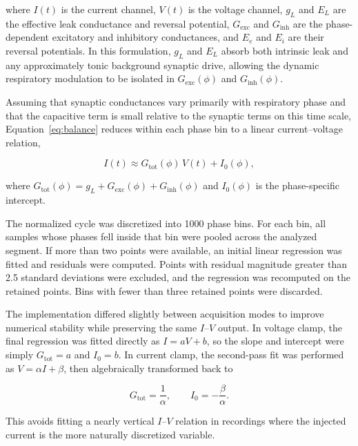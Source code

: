 \documentclass[
]{article}
\begin{document}
where \(I(t)\) is the current channel, \(V(t)\) is the voltage channel, \(g_L\) and \(E_L\) are the effective leak conductance and reversal potential, \(G_{\mathrm{exc}}\) and \(G_{\mathrm{inh}}\) are the phase-dependent excitatory and inhibitory conductances, and \(E_e\) and \(E_i\) are their reversal potentials. In this formulation, \(g_L\) and \(E_L\) absorb both intrinsic leak and any approximately tonic background synaptic drive, allowing the dynamic respiratory modulation to be isolated in \(G_{\mathrm{exc}}(\phi)\) and \(G_{\mathrm{inh}}(\phi)\).

Assuming that synaptic conductances vary primarily with respiratory phase and that the capacitive term is small relative to the synaptic terms on this time scale, Equation~\ref{eq:balance} reduces within each phase bin to a linear current--voltage relation,

\begin{equation}
I(t) \approx G_{\mathrm{tot}}(\phi)\,V(t) + I_0(\phi),
\end{equation}

where \(G_{\mathrm{tot}}(\phi)=g_L+G_{\mathrm{exc}}(\phi)+G_{\mathrm{inh}}(\phi)\) and \(I_0(\phi)\) is the phase-specific intercept.

The normalized cycle was discretized into 1000 phase bins. For each bin, all samples whose phases fell inside that bin were pooled across the analyzed segment. If more than two points were available, an initial linear regression was fitted and residuals were computed. Points with residual magnitude greater than 2.5 standard deviations were excluded, and the regression was recomputed on the retained points. Bins with fewer than three retained points were discarded.

The implementation differed slightly between acquisition modes to improve numerical stability while preserving the same \(I\)--\(V\) output. In voltage clamp, the final regression was fitted directly as \(I=aV+b\), so the slope and intercept were simply \(G_{\mathrm{tot}}=a\) and \(I_0=b\). In current clamp, the second-pass fit was performed as \(V=\alpha I+\beta\), then algebraically transformed back to

\begin{equation}
G_{\mathrm{tot}} = \frac{1}{\alpha}, \qquad I_0 = -\frac{\beta}{\alpha}.
\end{equation}

This avoids fitting a nearly vertical \(I\)--\(V\) relation in recordings where the injected current is the more naturally discretized variable.
\end{document}
